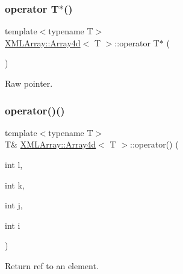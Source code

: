 \subsubsection{\texorpdfstring{operator T$\ast$()}{operator T*()}\hspace{0.1cm}{\footnotesize\ttfamily [2/2]}}
{\footnotesize\ttfamily template$<$typename T$>$ \\
\mbox{\hyperlink{classXMLArray_1_1Array4d}{X\+M\+L\+Array\+::\+Array4d}}$<$ T $>$\+::operator T$\ast$ (\begin{DoxyParamCaption}{ }\end{DoxyParamCaption})\hspace{0.3cm}{\ttfamily [inline]}}



Raw pointer. 

\mbox{\label{classXMLArray_1_1Array4d_aed3f4e517b15358348150e8212189b60}} 
\subsubsection{\texorpdfstring{operator()()}{operator()()}\hspace{0.1cm}{\footnotesize\ttfamily [1/4]}}
{\footnotesize\ttfamily template$<$typename T$>$ \\
T\& \mbox{\hyperlink{classXMLArray_1_1Array4d}{X\+M\+L\+Array\+::\+Array4d}}$<$ T $>$\+::operator() (\begin{DoxyParamCaption}\item[{int}]{l,  }\item[{int}]{k,  }\item[{int}]{j,  }\item[{int}]{i }\end{DoxyParamCaption})\hspace{0.3cm}{\ttfamily [inline]}}



Return ref to an element. 

\mbox{\label{classXMLArray_1_1Array4d_aed3f4e517b15358348150e8212189b60}} 
